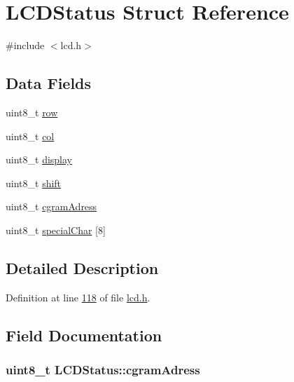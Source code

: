 \hypertarget{struct_l_c_d_status}{\section{L\-C\-D\-Status Struct Reference}
\label{struct_l_c_d_status}
}


{\ttfamily \#include $<$lcd.\-h$>$}

\subsection*{Data Fields}
\begin{DoxyCompactItemize}
\item 
uint8\-\_\-t \hyperlink{struct_l_c_d_status_a1032713b3106af056748cc1766bbf67f}{row}
\item 
uint8\-\_\-t \hyperlink{struct_l_c_d_status_a79a5d5cb370566c8638d9a3866ff8e6b}{col}
\item 
uint8\-\_\-t \hyperlink{struct_l_c_d_status_a844c7ce7851d43e9459d28c2e93d715a}{display}
\item 
uint8\-\_\-t \hyperlink{struct_l_c_d_status_ad69f767818d8a15e1fd6935e07df3770}{shift}
\item 
uint8\-\_\-t \hyperlink{struct_l_c_d_status_a896d1656ee60acf6ad7bcce2cdf3edae}{cgram\-Adress}
\item 
uint8\-\_\-t \hyperlink{struct_l_c_d_status_a8a1571d6288e2ec1ed1114fca2f873be}{special\-Char} \mbox{[}8\mbox{]}
\end{DoxyCompactItemize}


\subsection{Detailed Description}


Definition at line \hyperlink{lcd_8h_source_l00118}{118} of file \hyperlink{lcd_8h_source}{lcd.\-h}.



\subsection{Field Documentation}
\hypertarget{struct_l_c_d_status_a896d1656ee60acf6ad7bcce2cdf3edae}{
\subsubsection[{cgram\-Adress}]{\setlength{\rightskip}{0pt plus 5cm}uint8\-\_\-t L\-C\-D\-Status\-::cgram\-Adress}}\label{struct_l_c_d_status_a896d1656ee60acf6ad7bcce2cdf3edae}


